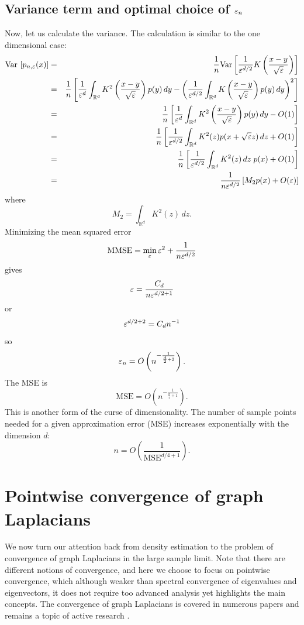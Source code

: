 \subsection{Variance term and optimal choice of $\varepsilon_n$}
Now, let us calculate the variance. The calculation is similar to the one dimensional case: 
\begin{eqnarray*}
\text{Var }[p_{n,\varepsilon}(x)] &=& \frac{1}{n} \text{Var}\left[\frac{1}{\varepsilon^{d/2}} K\left( \frac{x-y}{\sqrt{\varepsilon}}\right) \right] \nonumber\\
&=& \frac{1}{n} \left[ \frac{1}{\varepsilon^d} \int_{\mathbb{R}^d} K^2\left(\frac{x-y}{\sqrt{\varepsilon}}\right)p(y)\,dy - \left(\frac{1}{\varepsilon^{d/2}} \int_{\mathbb{R}^d} K\left(\frac{x-y}{\sqrt{\varepsilon}}\right)p(y)\,dy\right)^2\right] \nonumber \\
&=& \frac{1}{n} \left[ \frac{1}{\varepsilon^d} \int_{\mathbb{R}^d} K^2\left(\frac{x-y}{\sqrt{\varepsilon}}\right)p(y)\,dy - O(1) \right] \\
&=& \frac{1}{n} \left[ \frac{1}{\varepsilon^{d/2}}\int_{\mathbb{R}^d} K^2(z)p(x+\sqrt{\varepsilon}z)\,dz + O(1) \right] \nonumber\\
&=& \frac{1}{n} \left[ \frac{1}{\varepsilon^{d/2}}\int_{\mathbb{R}^d} K^2(z)\,dz \;p(x) + O(1) \right] \nonumber\\
&=& \frac{1}{n\varepsilon^{d/2}} \left[M_2 p(x) + O(\varepsilon)\right]
\end{eqnarray*}
where
$$M_2 = \int_{\mathbb{R}^d} K^2(z)\,dz.$$
Minimizing the mean squared error
$$\text{MMSE} = \min_{\varepsilon} \varepsilon^2 + \frac{1}{n\varepsilon^{d/2}}$$
gives
$$\varepsilon = \frac{C_d}{n\varepsilon^{d/2+1}}$$
or
$$\varepsilon^{d/2 + 2} = C_d n^{-1}$$
so
$$\varepsilon_n = O\left(n^{-\frac{1}{\frac{d}{2}+2}}\right).$$
The MSE is
$$\text{MSE} = O\left(n^{-\frac{1}{\frac{d}{4}+1}}\right).$$
This is another form of the curse of dimensionality. The number of sample points needed for a given approximation error (MSE) increases exponentially with the dimension $d$:
$$n = O\left(\frac{1}{\text{MSE}^{d/4+1}}\right).$$



\section{Pointwise convergence of graph Laplacians}
We now turn our attention back from density estimation to the problem of convergence of graph Laplacians in the large sample limit. Note that there are different notions of convergence, and here we choose to focus on pointwise convergence, which although weaker than spectral convergence of eigenvalues and eigenvectors, it does not require too advanced analysis yet highlights the main concepts. The convergence of graph Laplacians is covered in numerous papers and remains a topic of active research \cite{belkin2005towards,hein2005graphs,singer2006graph,belkin2006convergence,gine2006empirical,singer2017spectral,trillos2018variational,garcia2020error,calder2022improved}.        



